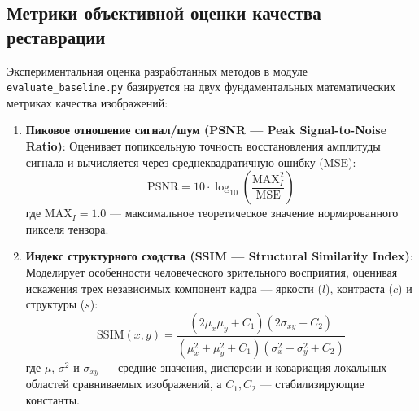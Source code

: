 \documentclass[12pt,a4paper]{article}
\begin{document}
\subsection{Метрики объективной оценки качества реставрации}
Экспериментальная оценка разработанных методов в модуле \texttt{evaluate\_baseline.py} базируется на двух фундаментальных математических метриках качества изображений:


\begin{enumerate}
    \item \textbf{Пиковое отношение сигнал/шум (PSNR --- Peak Signal-to-Noise Ratio)}: Оценивает попиксельную точность восстановления амплитуды сигнала и вычисляется через среднеквадратичную ошибку ($\text{MSE}$):
    \begin{equation}
        \text{PSNR} = 10 \cdot \log_{10} \left( \frac{\text{MAX}_I^2}{\text{MSE}} \right)
    \end{equation}
    где $\text{MAX}_I = 1.0$ --- максимальное теоретическое значение нормированного пикселя тензора.
    
    \item \textbf{Индекс структурного сходства (SSIM --- Structural Similarity Index)}: Моделирует особенности человеческого зрительного восприятия, оценивая искажения трех независимых компонент кадра --- яркости ($l$), контраста ($c$) и структуры ($s$):
    \begin{equation}
        \text{SSIM}(x, y) = \frac{(2\mu_x\mu_y + C_1)(2\sigma_{xy} + C_2)}{(\mu_x^2 + \mu_y^2 + C_1)(\sigma_x^2 + \sigma_y^2 + C_2)}
    \end{equation}
    где $\mu$, $\sigma^2$ и $\sigma_{xy}$ --- средние значения, дисперсии и ковариация локальных областей сравниваемых изображений, а $C_1, C_2$ --- стабилизирующие константы.
\end{enumerate}
\end{document}
